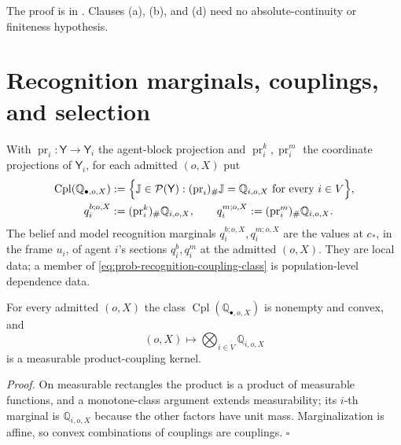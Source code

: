 The proof is in . Clauses (a), (b), and (d) need no absolute-continuity or
finiteness hypothesis.

\section{Recognition marginals, couplings, and selection}
\label{sec:prob-marginals}

With $\operatorname{pr}_i:\mathsf Y\to\mathsf Y_i$ the agent-block projection and
$\operatorname{pr}_i^k,\operatorname{pr}_i^m$ the coordinate projections of $\mathsf Y_i$, for each admitted
$(o,X)$ put
\begin{align}
\operatorname{Cpl}(\mathbb Q_{\bullet,o,X})
&:=\Bigl\{\mathbb J\in\mathcal P(\mathsf Y):(\operatorname{pr}_i)_\#\mathbb J=\mathbb Q_{i,o,X}\text{ for every }i\in V\Bigr\},
\label{eq:prob-recognition-coupling-class}\\
q_i^{b;o,X}&:=(\operatorname{pr}_i^k)_\#\mathbb Q_{i,o,X},
\qquad
q_i^{m;o,X}:=(\operatorname{pr}_i^m)_\#\mathbb Q_{i,o,X}.
\label{eq:prob-recognition-marginals}
\end{align}
The belief and model recognition marginals $q_i^{b;o,X},q_i^{m;o,X}$ are the values at $c_*$, in the frame
$u_i$, of agent $i$'s sections $q_i^b,q_i^m$ at the admitted $(o,X)$. They are local data; a member of
\eqref{eq:prob-recognition-coupling-class} is population-level dependence data.

For every admitted $(o,X)$ the class $\operatorname{Cpl}(\mathbb Q_{\bullet,o,X})$ is nonempty and convex,
and
\begin{equation}
(o,X)\longmapsto\bigotimes_{i\in V}\mathbb Q_{i,o,X}
\label{eq:prob-product-coupling-kernel}
\end{equation}
is a measurable product-coupling kernel. 

\noindent\emph{Proof.}
On measurable rectangles the product is a product of measurable functions, and a monotone-class argument
extends measurability; its $i$-th marginal is $\mathbb Q_{i,o,X}$ because the other factors have unit
mass. Marginalization is affine, so convex combinations of couplings are couplings. \hfill$\square$

